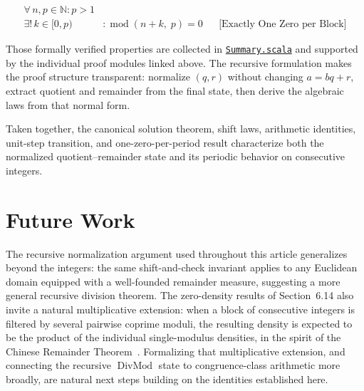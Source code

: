 \begin{equation*}
\begin{aligned}
\forall\, n, p \in \mathbb{N} : p > 1 \\
\exists!\, k \in [0, p) &: \operatorname{mod}(n + k,\; p) = 0
  &&\text{[Exactly One Zero per Block]}
\end{aligned}
\end{equation*}

Those formally verified properties are collected in
\href{https://github.com/thiagomata/prime-numbers/blob/modulo-article-v1.0.0/src/main/scala/v1/chapter2/div/properties/Summary.scala}{\texttt{Summary.scala}}
and supported by the individual proof modules linked above. The recursive
formulation makes the proof structure transparent: normalize $(q,r)$ without
changing $a=bq+r$, extract quotient and remainder from the final state, then
derive the algebraic laws from that normal form.

Taken together, the canonical solution theorem, shift laws, arithmetic
identities, unit-step transition, and one-zero-per-period result
characterize both the normalized quotient--remainder state and its periodic
behavior on consecutive integers.

\section{Future Work}
\label{sec:future-work}

The recursive normalization argument used throughout this article
generalizes beyond the integers: the same shift-and-check invariant applies
to any Euclidean domain equipped with a well-founded remainder measure,
suggesting a more general recursive division theorem. The zero-density
results of Section~6.14 also invite a natural multiplicative extension: when
a block of consecutive integers is filtered by several pairwise coprime
moduli, the resulting density is expected to be the product of the
individual single-modulus densities, in the spirit of the Chinese Remainder
Theorem~\cite{hardywright1979}. Formalizing that multiplicative extension,
and connecting the recursive $\operatorname{DivMod}$ state to
congruence-class arithmetic more broadly, are natural next steps building
on the identities established here.
